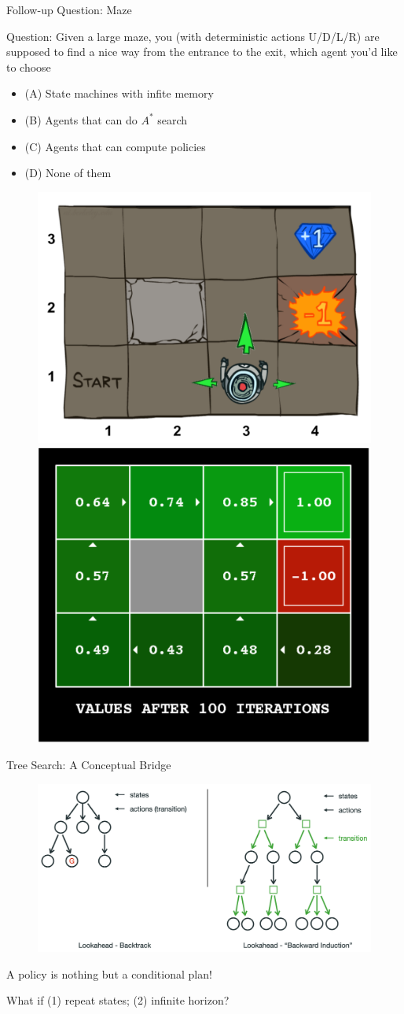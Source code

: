 \documentclass{beamer}
\begin{document}
\begin{frame}{Follow-up Question: Maze}
    \begin{exampleblock}{Question:}
        Given a large maze,
        you (with deterministic actions U/D/L/R) are supposed to find a nice way from the entrance to the exit,
        which agent you'd like to choose
        \begin{itemize}
            \item (A) State machines with infite memory
            \item (B) Agents that can do $A^*$ search
            \item (C) Agents that can compute policies
            \item (D) None of them
        \end{itemize}
        
        \vspace{-3mm}
        \begin{figure}[htpb]
            \centering
            \includegraphics[width=0.3\linewidth]{pic/maze.png}
            \pause
            \includegraphics[width=0.25\linewidth]{pic/maze_ret.png}
        \end{figure}
    \end{exampleblock}
\end{frame}


\begin{frame}{Tree Search: A Conceptual Bridge}
\begin{figure}[htpb]
\centering
    \includegraphics[width=1\linewidth]{pic/tree.png}
\end{figure}
\centering
\alert{A policy is nothing but a conditional plan!}

\pause
\alert{What if (1) repeat states; (2) infinite horizon?}
\end{frame}
\end{document}
